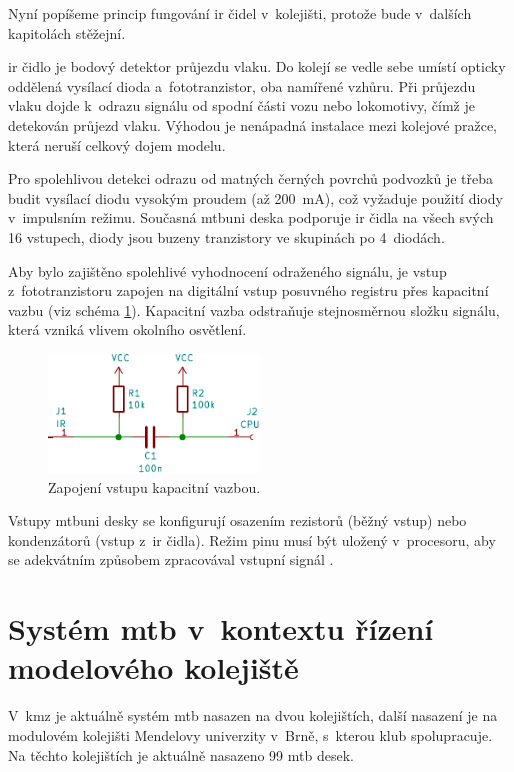 Nyní popíšeme princip fungování \gls{ir} čidel v~kolejišti, protože bude v~dalších
kapitolách stěžejní.

\gls{ir} čidlo je bodový detektor průjezdu vlaku. Do kolejí se vedle sebe umístí
opticky oddělená vysílací dioda a~fototranzistor, oba namířené vzhůru. Při
průjezdu vlaku dojde k~odrazu signálu od spodní části vozu nebo lokomotivy,
čímž je detekován průjezd vlaku. Výhodou je nenápadná instalace mezi kolejové
pražce, která neruší celkový dojem modelu.

Pro spolehlivou detekci odrazu od matných černých povrchů podvozků je třeba
budit vysílací diodu vysokým proudem (až 200~mA), což vyžaduje použití
diody v~impulsním režimu. Současná \gls{mtbuni} deska podporuje \gls{ir} čidla na
všech svých 16 vstupech, diody jsou buzeny tranzistory ve skupinách po
4~diodách.

Aby bylo zajištěno spolehlivé vyhodnocení odraženého signálu, je vstup
z~fototranzistoru zapojen na digitální vstup posuvného registru přes kapacitní
vazbu (viz schéma \ref{fig:cap-bind}). Kapacitní vazba odstraňuje stejnosměrnou
složku signálu, která vzniká vlivem okolního osvětlení.

\begin{figure}[ht]
\includegraphics[width=0.5\textwidth]{data/cap-bind/capacitive-bind-example.pdf}
\caption{Zapojení vstupu kapacitní vazbou.}
\label{fig:cap-bind}
\end{figure}

Vstupy \gls{mtbuni} desky se konfigurují osazením rezistorů (běžný
vstup) nebo kondenzátorů (vstup z~\gls{ir} čidla). Režim pinu musí být
uložený v~procesoru, aby se adekvátním způsobem zpracovával vstupní signál
\cite{mtbuni22-specs}.


\section{Systém \gls{mtb} v~kontextu řízení modelového kolejiště} \label{sec:mtb_context}

V~\gls{kmz} je aktuálně systém \gls{mtb} nasazen na dvou kolejištích, další
nasazení je na modulovém kolejišti Mendelovy univerzity v~Brně, s~kterou klub
spolupracuje. Na těchto kolejištích je aktuálně nasazeno 99 \gls{mtb} desek.

